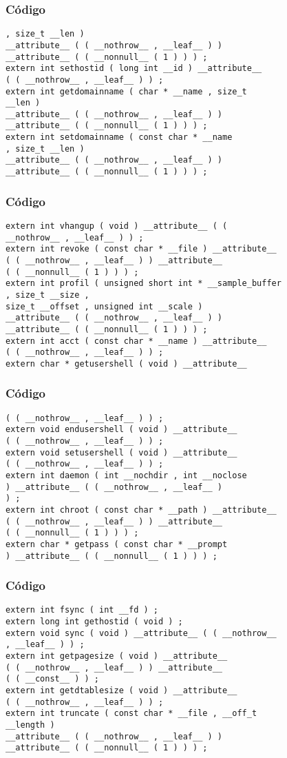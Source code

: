\documentclass{beamer}
\begin{document}
\begin{frame}[fragile]
\frametitle{C\'odigo}
\begin{verbatim}
, size_t __len ) 
__attribute__ ( ( __nothrow__ , __leaf__ ) ) 
__attribute__ ( ( __nonnull__ ( 1 ) ) ) ; 
extern int sethostid ( long int __id ) __attribute__ 
( ( __nothrow__ , __leaf__ ) ) ; 
extern int getdomainname ( char * __name , size_t 
__len ) 
__attribute__ ( ( __nothrow__ , __leaf__ ) ) 
__attribute__ ( ( __nonnull__ ( 1 ) ) ) ; 
extern int setdomainname ( const char * __name 
, size_t __len ) 
__attribute__ ( ( __nothrow__ , __leaf__ ) ) 
__attribute__ ( ( __nonnull__ ( 1 ) ) ) ; 
\end{verbatim}
\end{frame}
\begin{frame}[fragile]
\frametitle{C\'odigo}
\begin{verbatim}
extern int vhangup ( void ) __attribute__ ( ( 
__nothrow__ , __leaf__ ) ) ; 
extern int revoke ( const char * __file ) __attribute__ 
( ( __nothrow__ , __leaf__ ) ) __attribute__ 
( ( __nonnull__ ( 1 ) ) ) ; 
extern int profil ( unsigned short int * __sample_buffer 
, size_t __size , 
size_t __offset , unsigned int __scale ) 
__attribute__ ( ( __nothrow__ , __leaf__ ) ) 
__attribute__ ( ( __nonnull__ ( 1 ) ) ) ; 
extern int acct ( const char * __name ) __attribute__ 
( ( __nothrow__ , __leaf__ ) ) ; 
extern char * getusershell ( void ) __attribute__ 
\end{verbatim}
\end{frame}
\begin{frame}[fragile]
\frametitle{C\'odigo}
\begin{verbatim}
( ( __nothrow__ , __leaf__ ) ) ; 
extern void endusershell ( void ) __attribute__ 
( ( __nothrow__ , __leaf__ ) ) ; 
extern void setusershell ( void ) __attribute__ 
( ( __nothrow__ , __leaf__ ) ) ; 
extern int daemon ( int __nochdir , int __noclose 
) __attribute__ ( ( __nothrow__ , __leaf__ ) 
) ; 
extern int chroot ( const char * __path ) __attribute__ 
( ( __nothrow__ , __leaf__ ) ) __attribute__ 
( ( __nonnull__ ( 1 ) ) ) ; 
extern char * getpass ( const char * __prompt 
) __attribute__ ( ( __nonnull__ ( 1 ) ) ) ; 
\end{verbatim}
\end{frame}
\begin{frame}[fragile]
\frametitle{C\'odigo}
\begin{verbatim}
extern int fsync ( int __fd ) ; 
extern long int gethostid ( void ) ; 
extern void sync ( void ) __attribute__ ( ( __nothrow__ 
, __leaf__ ) ) ; 
extern int getpagesize ( void ) __attribute__ 
( ( __nothrow__ , __leaf__ ) ) __attribute__ 
( ( __const__ ) ) ; 
extern int getdtablesize ( void ) __attribute__ 
( ( __nothrow__ , __leaf__ ) ) ; 
extern int truncate ( const char * __file , __off_t 
__length ) 
__attribute__ ( ( __nothrow__ , __leaf__ ) ) 
__attribute__ ( ( __nonnull__ ( 1 ) ) ) ; 
\end{verbatim}
\end{frame}
\end{document}

